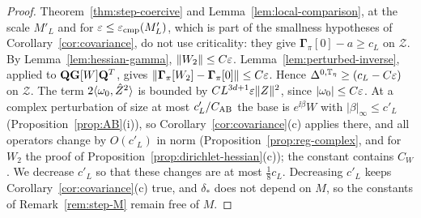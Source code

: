 \begin{proof}
Theorem~\ref{thm:step-coercive} and Lemma~\ref{lem:local-comparison}, at the scale $M'_L$ and for $\varepsilon\le\varepsilon_{\rm cmp}(M'_L)$, which is part of the smallness hypotheses of Corollary~\ref{cor:covariance}, do not use criticality: they give $\boldsymbol\Gamma_\pi[0]-a\ge c_L$ on $\mathcal Z$. By Lemma~\ref{lem:hessian-gamma}, $\|W_2\|\le C\varepsilon$. Lemma~\ref{lem:perturbed-inverse}, applied to $\mathbf Q\mathbf G[W]\mathbf Q^T$, gives $\|\boldsymbol\Gamma_\pi[W_2]-\boldsymbol\Gamma_\pi[0]\|\le C\varepsilon$. Hence $\Delta^{0,\mathbb T_\eta}\ge(c_L-C\varepsilon)$ on $\mathcal Z$. The term $2\langle \omega_0,\hat Z^2\rangle$ is bounded by $CL^{3d+1}\varepsilon\|Z\|^2$, since $|\omega_0|\le C\varepsilon$. At a complex perturbation of size at most $c'_L/C_{\rm AB}$ the base is $e^{\ii\beta}W$ with $|\beta|_\infty\le c'_L$ (Proposition~\ref{prop:AB}(i)), so Corollary~\ref{cor:covariance}(c) applies there, and all operators change by $O(c'_L)$ in norm (Proposition~\ref{prop:reg-complex}, and for $W_2$ the proof of Proposition~\ref{prop:dirichlet-hessian}(c)); the constant contains $C_W$. We decrease $c'_L$ so that these changes are at most $\frac18c_L$. Decreasing $c'_L$ keeps Corollary~\ref{cor:covariance}(c) true, and $\delta_*$ does not depend on $M$, so the constants of Remark~\ref{rem:step-M} remain free of $M$.
\end{proof}

